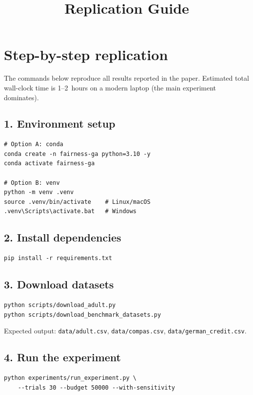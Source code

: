 \documentclass[10pt]{article}
\title{Replication Guide}
\author{}
\date{}
\begin{document}
\maketitle

\section*{Step-by-step replication}

The commands below reproduce all results reported in the paper.  Estimated total
wall-clock time is 1--2~hours on a modern laptop (the main experiment dominates).

\subsection*{1. Environment setup}

\begin{verbatim}
# Option A: conda
conda create -n fairness-ga python=3.10 -y
conda activate fairness-ga

# Option B: venv
python -m venv .venv
source .venv/bin/activate    # Linux/macOS
.venv\Scripts\activate.bat   # Windows
\end{verbatim}

\subsection*{2. Install dependencies}

\begin{verbatim}
pip install -r requirements.txt
\end{verbatim}

\subsection*{3. Download datasets}

\begin{verbatim}
python scripts/download_adult.py
python scripts/download_benchmark_datasets.py
\end{verbatim}

Expected output: \texttt{data/adult.csv}, \texttt{data/compas.csv},
\texttt{data/german\_credit.csv}.

\subsection*{4. Run the experiment}

\begin{verbatim}
python experiments/run_experiment.py \
    --trials 30 --budget 50000 --with-sensitivity
\end{verbatim}
\end{document}
